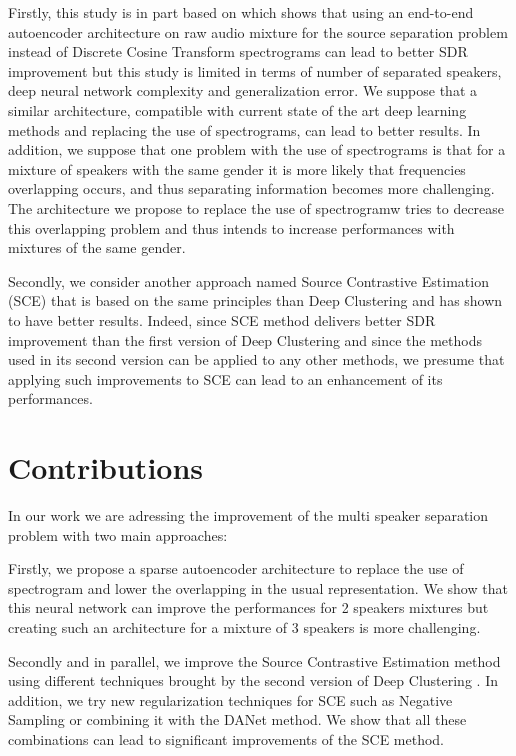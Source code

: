 \documentclass[master, tikz, final,11pt, dvipdfmx]{iscs-thesis}
\begin{document}
Firstly, this study is in part based on \cite{Adaptive} which shows that using an end-to-end autoencoder architecture on raw audio mixture for the source separation problem instead of Discrete Cosine Transform spectrograms can lead to better SDR improvement but this study is limited in terms of number of separated speakers, deep neural network complexity and generalization error. We suppose that a similar architecture, compatible with current state of the art deep learning methods and replacing the use of spectrograms, can lead to better results. In addition, we suppose that one problem with the use of spectrograms is that for a mixture of speakers with the same gender it is more likely that frequencies overlapping occurs, and thus separating information becomes more challenging. The architecture we propose to replace the use of spectrogramw tries to decrease this overlapping problem and thus intends to increase performances with mixtures of the same gender. 

Secondly, we consider another approach named Source Contrastive Estimation (SCE) \cite{SCE} that is based on the same principles than Deep Clustering and has shown to have better results. Indeed, since SCE method delivers better SDR improvement than the first version of Deep Clustering \cite{DPCLV1} and since the methods used in its second version \cite{DPCLV2} can be applied to any other methods, we presume that applying such improvements to SCE can lead to an enhancement of its performances.


\section{Contributions}
\label{contrib}

In our work we are adressing the improvement of the multi speaker separation problem with two main approaches:

Firstly, we propose a sparse autoencoder architecture to replace the use of spectrogram and lower the overlapping in the usual representation. We show that this neural network can improve the performances for 2 speakers mixtures but creating such an architecture for a mixture of 3 speakers is more challenging.

Secondly and in parallel, we improve the Source Contrastive Estimation method using different techniques brought by the second version of Deep Clustering \cite{DPCLV2}. In addition, we try new regularization techniques for SCE such as Negative Sampling or combining it with the DANet \cite{DANet} method. We show that all these combinations can lead to significant improvements of the SCE method.
\end{document}
